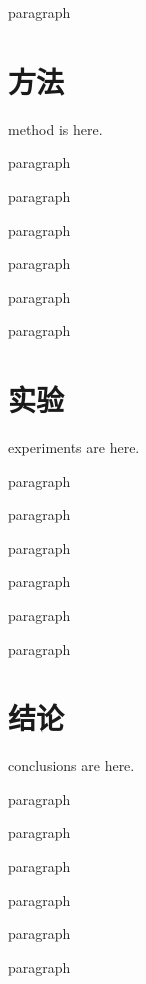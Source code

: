 \documentclass{ctexart}
\begin{document}
	paragraph

	\section{方法}

	method is here.

	paragraph

	paragraph

	paragraph

	paragraph

	paragraph

	paragraph

	\section{实验}

	experiments are here.

	paragraph

	paragraph

	paragraph

	paragraph

	paragraph

	paragraph

	\section{结论}

	conclusions are here.

	paragraph

	paragraph

	paragraph

	paragraph

	paragraph

	paragraph
	
	
\end{document}
